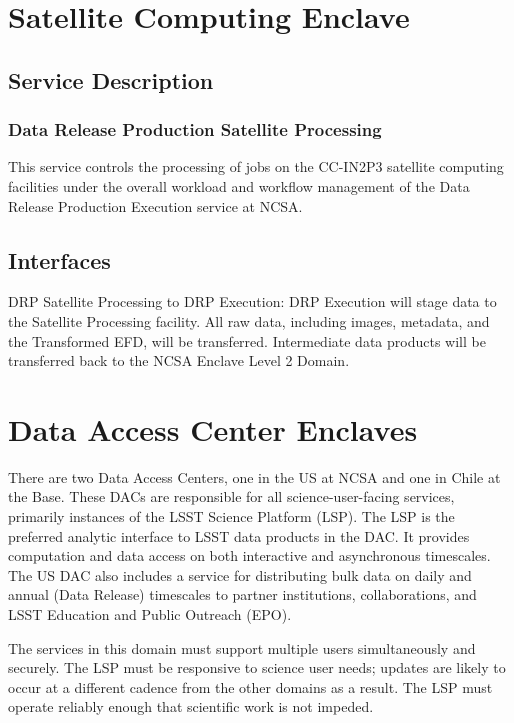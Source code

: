 \documentclass[DM,lsstdraft,toc]{lsstdoc}
\begin{document}
\section{Satellite Computing Enclave}\label{satellite-computing-enclave}

\subsection{Service Description}\label{satellite-service-description}

\subsubsection{Data Release Production Satellite
Processing}\label{data-release-production-satellite-processing}

This service controls the processing of jobs on the CC-IN2P3 satellite
computing facilities under the overall workload and workflow management
of the Data Release Production Execution service at NCSA.

\subsection{Interfaces}\label{satellite-interfaces}
DRP Satellite Processing to DRP Execution: DRP Execution will stage data
to the Satellite Processing facility.  All raw data, including images,
metadata, and the Transformed EFD, will be transferred.  Intermediate
data products will be transferred back to the NCSA Enclave Level 2 Domain.


\section{Data Access Center Enclaves}\label{data-access-center-enclaves}

There are two Data Access Centers, one in the US at NCSA and one in
Chile at the Base. These DACs are responsible for all
science-user-facing services, primarily instances of the LSST Science
Platform (LSP). The LSP is the preferred analytic interface to LSST data
products in the DAC. It provides computation and data access on both
interactive and asynchronous timescales. The US DAC also includes a
service for distributing bulk data on daily and annual (Data Release)
timescales to partner institutions, collaborations, and LSST Education
and Public Outreach (EPO).

The services in this domain must support multiple users simultaneously
and securely. The LSP must be responsive to science user needs; updates
are likely to occur at a different cadence from the other domains as a
result. The LSP must operate reliably enough that scientific work is not
impeded.
\end{document}
